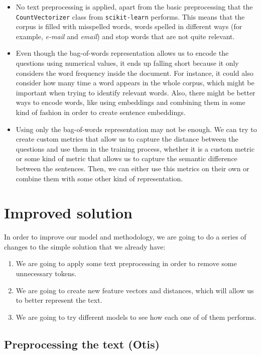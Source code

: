 \documentclass[11pt,a4paper]{article}
\begin{document}
\begin{itemize}
  \item No text preprocessing is applied, apart from the basic preprocessing that
  the \texttt{CountVectorizer} class from \texttt{scikit-learn} performs. This means
  that the corpus is filled with misspelled words, words spelled in different ways
  (for example, \emph{e-mail} and \emph{email}) and stop words that are not quite
  relevant.
  \item Even though the bag-of-words representation allows us to encode the questions
  using numerical values, it ends up falling short because it only considers the word
  frequency inside the document. For instance, it could also consider how many time a
  word appears in the whole corpus, which might be important when trying to identify
  relevant words. Also, there might be better ways to encode words, like using embeddings
  and combining them in some kind of fashion in order to create sentence embeddings.
  \item Using only the bag-of-words representation may not be enough. We can try to create
  custom metrics that allow us to capture the distance between the questions and use them
  in the training process, whether it is a custom metric or some kind of metric that allows
  us to capture the semantic difference between the sentences. Then, we can either use this
  metrics on their own or combine them with some other kind of representation.
\end{itemize}

\section{Improved solution}

In order to improve our model and methodology, we are going to do a series of changes
to the simple solution that we already have:

\begin{enumerate}
  \item We are going to apply some text preprocessing in order to remove some
  unnecessary tokens.
  \item We are going to create new feature vectors and distances, which
  will allow us to better represent the text.
  \item We are going to try different models to see how each one of of them performs.
\end{enumerate}

\subsection{Preprocessing the text (Otis)}
\end{document}
